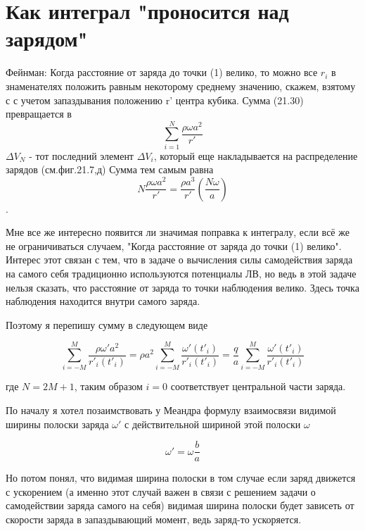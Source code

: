 \documentclass{article}
\begin{document}


\section{Как интеграл "проносится над зарядом"}

Фейнман:
Когда расстояние от заряда до точки (1) велико, то можно все $r_i$ в знаменателях положить равным некоторому среднему значению, скажем, взятому с с учетом запаздывания положению r' центра кубика. Сумма (21.30) превращается в 
$$\sum\limits_{i=1}^N \frac{\rho \omega a^2}{r'}$$
$\Delta V_N$ - тот последний элемент $\Delta V_i$, который еще накладывается на распределение зарядов (см.фиг.21.7,д)
Сумма тем самым равна
$$N\frac{\rho \omega a^2}{r'}=\frac{\rho a^3}{r'}\left (\frac{N\omega}{a}\right )$$.

Мне все же интересно появится ли значимая поправка к интегралу, если всё же не ограничиваться случаем, "Когда расстояние от заряда до точки (1) велико". Интерес этот связан с тем, что в задаче о вычисления силы самодействия заряда на самого себя традиционно используются потенциалы ЛВ, но ведь в этой задаче нельзя сказать, что расстояние от заряда то точки наблюдения велико. Здесь точка наблюдения находится внутри самого заряда.

Поэтому я перепишу сумму в следующем виде

$$\sum\limits_{i=-M}^M \frac{\rho \omega' a^2}{r'_{i}(t'_{i})}=\rho  a^2\sum\limits_{i=-M}^M \frac{\omega'(t'_{i})}{r'_{i}(t'_{i})}= \frac{q}{a}\sum\limits_{i=-M}^M \frac{\omega'(t'_{i})}{r'_{i}(t'_{i})}$$

где $N=2M+1$, таким образом $i=0$ соответствует центральной части заряда. 

По началу я хотел позаимствовать у Меандра формулу взаимосвязи видимой ширины полоски заряда  $\omega'$ с действительной шириной этой полоски  $\omega$

$$\omega' =  \omega \frac{b}{a}$$

Но потом понял, что видимая ширина полоски в том случае если заряд движется с ускорением (а именно этот случай важен в связи с решением задачи о самодействии заряда самого на себя) видимая ширина полоски будет зависеть от скорости заряда в запаздывающий момент, ведь заряд-то ускоряется. 
\end{document}
